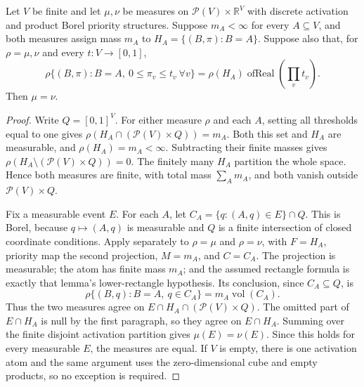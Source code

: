 \begin{lemma}
Let $V$ be finite and let $\mu,\nu$ be measures on
$\mathcal P(V)\times\mathbb R^V$ with discrete activation and product Borel
priority structures. Suppose $m_A<\infty$ for every $A\subseteq V$, and
both measures assign mass $m_A$ to $H_A=\{(B,\pi):B=A\}$.
Suppose also that, for $\rho=\mu,\nu$ and every $t:V\to[0,1]$,
\[
\rho\{(B,\pi):B=A,\ 0\le\pi_v\le t_v\ \forall v\}
=\rho(H_A)\operatorname{ofReal}(\prod_v t_v).
\]
Then $\mu=\nu$.
\end{lemma}
\begin{proof}
Write $Q=[0,1]^V$. For either measure $\rho$ and each $A$, setting all
thresholds equal to one gives $\rho(H_A\cap(\mathcal P(V)\times Q))=m_A$.
Both this set and $H_A$ are measurable, and $\rho(H_A)=m_A<\infty$.
Subtracting their finite masses gives
$\rho(H_A\setminus(\mathcal P(V)\times Q))=0$.
The finitely many $H_A$ partition the whole space. Hence both measures are
finite, with total mass $\sum_A m_A$, and both vanish outside
$\mathcal P(V)\times Q$.

Fix a measurable event $E$. For each $A$, let
$C_A=\{q:(A,q)\in E\}\cap Q$. This is Borel, because
$q\mapsto(A,q)$ is measurable and $Q$ is a finite intersection of closed
coordinate conditions. Apply
 separately
to $\rho=\mu$ and $\rho=\nu$, with $F=H_A$, priority map the second
projection, $M=m_A$, and $C=C_A$. The projection is measurable; the atom
has finite mass $m_A$; and the assumed rectangle formula is exactly that
lemma's lower-rectangle hypothesis. Its conclusion, since $C_A\subseteq Q$,
is
\[
\rho\{(B,q):B=A,\ q\in C_A\}=m_A\operatorname{vol}(C_A).
\]
Thus the two measures agree on $E\cap H_A\cap(\mathcal P(V)\times Q)$.
The omitted part of $E\cap H_A$ is null by the first paragraph, so they agree
on $E\cap H_A$. Summing over the finite disjoint activation partition gives
$\mu(E)=\nu(E)$. Since this holds for every measurable $E$, the measures
are equal. If $V$ is empty, there is one activation atom and the same argument
uses the zero-dimensional cube and empty products, so no exception is required.
\end{proof}
